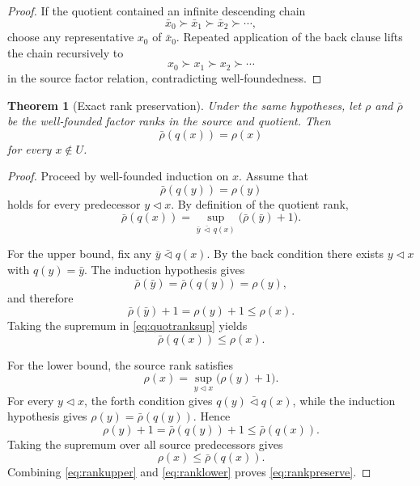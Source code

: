 \documentclass[11pt]{article}
\newtheorem{theorem}{Theorem}[section]
\theoremstyle{definition}
\theoremstyle{remark}
\begin{document}
\begin{proof}
If the quotient contained an infinite descending chain
\[
\bar x_0\succ\bar x_1\succ\bar x_2\succ\cdots,
\]
choose any representative \(x_0\) of \(\bar x_0\). Repeated application of the back clause lifts the chain recursively to
\[
x_0\succ x_1\succ x_2\succ\cdots
\]
in the source factor relation, contradicting well-foundedness.
\end{proof}

\begin{theorem}[Exact rank preservation]
Under the same hypotheses, let \(\rho\) and \(\bar\rho\) be the well-founded factor ranks in the source and quotient. Then
\begin{equation}
\boxed{\bar\rho(q(x))=\rho(x)}
\label{eq:rankpreserve}
\end{equation}
for every \(x\notin U\).
\end{theorem}

\begin{proof}
Proceed by well-founded induction on \(x\). Assume that
\[
\bar\rho(q(y))=\rho(y)
\]
holds for every predecessor \(y\triangleleft x\). By definition of the quotient rank,
\begin{equation}
\bar\rho(q(x))
=
\sup_{\bar y\,\bar\triangleleft\,q(x)}
\bigl(\bar\rho(\bar y)+1\bigr).
\label{eq:quotranksup}
\end{equation}

For the upper bound, fix any \(\bar y\bar\triangleleft q(x)\). By the back condition there exists \(y\triangleleft x\) with \(q(y)=\bar y\). The induction hypothesis gives
\[
\bar\rho(\bar y)=\bar\rho(q(y))=\rho(y),
\]
and therefore
\[
\bar\rho(\bar y)+1=\rho(y)+1\le\rho(x).
\]
Taking the supremum in \eqref{eq:quotranksup} yields
\begin{equation}
\bar\rho(q(x))\le\rho(x).
\label{eq:rankupper}
\end{equation}

For the lower bound, the source rank satisfies
\[
\rho(x)=\sup_{y\triangleleft x}\bigl(\rho(y)+1\bigr).
\]
For every \(y\triangleleft x\), the forth condition gives \(q(y)\bar\triangleleft q(x)\), while the induction hypothesis gives \(\rho(y)=\bar\rho(q(y))\). Hence
\[
\rho(y)+1
=
\bar\rho(q(y))+1
\le
\bar\rho(q(x)).
\]
Taking the supremum over all source predecessors gives
\begin{equation}
\rho(x)\le\bar\rho(q(x)).
\label{eq:ranklower}
\end{equation}
Combining \eqref{eq:rankupper} and \eqref{eq:ranklower} proves \eqref{eq:rankpreserve}.
\end{proof}
\end{document}
